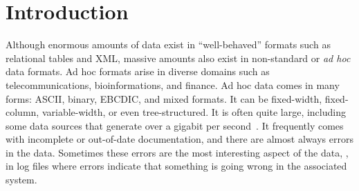 \section{Introduction}
\label{section:intro}
Although enormous amounts of data exist in ``well-behaved'' formats such
as relational tables and XML, massive amounts also exist in
non-standard or \textit{ad hoc} data formats. 
Ad hoc formats arise in diverse domains such as
telecommunications, bioinformations, and finance.
Ad hoc data comes in many forms: ASCII, binary, EBCDIC, and mixed
formats.  It can be fixed-width, fixed-column, variable-width, or even
tree-structured.  It is often quite large, including some data sources
that generate over a gigabit per second~\cite{gigascope}. It frequently
comes with incomplete or out-of-date documentation, and there are
almost always errors in the data.  Sometimes these errors are the most
interesting aspect of the data, \eg{}, in log files where
errors indicate that something is going wrong in the associated
system.

